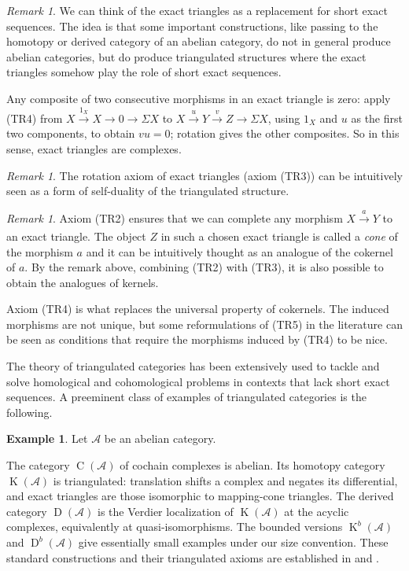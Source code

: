 \documentclass[11pt,reqno,a4paper]{amsart}
\theoremstyle{definition}
\newtheorem{example}[theorem]{Example}
\theoremstyle{remark}
\newtheorem{remark}[theorem]{Remark}
\newcommand{\A}{\mathcal{A}}
\newcommand{\0}{\mathbf{0}}
\renewcommand{\1}{\mathbf{1}}
\newcommand{\aar}[2][]{\xrightarrow[#1]{#2}}
\begin{document}
\begin{remark}\label{remexacttrianglesasses}
    We can think of the exact triangles as a replacement for short exact sequences. The idea is that some important constructions, like passing to the homotopy or derived category of an abelian category, do not in general produce abelian categories, but do produce triangulated structures where the exact triangles somehow play the role of short exact sequences.

    Any composite of two consecutive morphisms in an exact triangle is zero: apply (TR4) from $X\xrightarrow{1_X}X\to0\to\Sigma X$ to $X\xrightarrow{u}Y\xrightarrow{v}Z\to\Sigma X$, using $1_X$ and $u$ as the first two components, to obtain $vu=0$; rotation gives the other composites. So in this sense, exact triangles are complexes.
\end{remark}

\begin{remark}
    The rotation axiom of exact triangles (axiom (TR3)) can be intuitively seen as a form of self-duality of the triangulated structure.
\end{remark}

\begin{remark}\label{remconesascokernels}
    Axiom (TR2) ensures that we can complete any morphism $X \aar{a} Y$ to an exact triangle. The object $Z$ in such a chosen exact triangle is called a \textit{cone} of the morphism $a$ and it can be intuitively thought as an analogue of the cokernel of $a$. By the remark above, combining (TR2) with (TR3), it is also possible to obtain the analogues of kernels.

    Axiom (TR4) is what replaces the universal property of cokernels. The induced morphisms are not unique, but some reformulations of (TR5) in the literature can be seen as conditions that require the morphisms induced by (TR4) to be nice.
\end{remark}

The theory of triangulated categories has been extensively used to tackle and solve homological and cohomological problems in contexts that lack short exact sequences. A preeminent class of examples of triangulated categories is the following.

\begin{example}
    Let $\A$ be an abelian category.

    The category $\operatorname{C}(\A)$ of cochain complexes is abelian. Its homotopy category $\operatorname{K}(\A)$ is triangulated: translation shifts a complex and negates its differential, and exact triangles are those isomorphic to mapping-cone triangles. The derived category $\operatorname{D}(\A)$ is the Verdier localization of $\operatorname{K}(\A)$ at the acyclic complexes, equivalently at quasi-isomorphisms. The bounded versions $\operatorname{K}^b(\A)$ and $\operatorname{D}^b(\A)$ give essentially small examples under our size convention. These standard constructions and their triangulated axioms are established in \cite[Chapter III]{GelfandManin} and \cite{Verdier,StacksDerived}.
\end{example}
\end{document}
